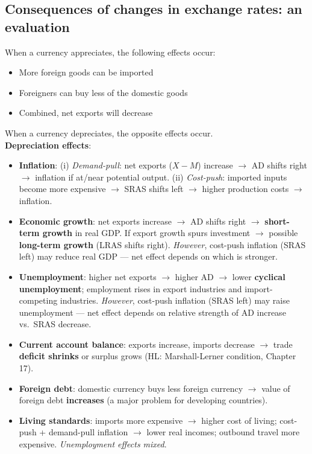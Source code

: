 \documentclass[a4paper,12pt]{article}
\begin{document}
\subsection{Consequences of changes in exchange rates: an evaluation}
When a currency appreciates, the following effects occur:
\begin{itemize}
  \item More foreign goods can be imported
  \item Foreigners can buy less of the domestic goods
  \item Combined, net exports will decrease
\end{itemize}
When a currency depreciates, the opposite effects occur.\\
\textbf{Depreciation effects}:
\begin{itemize}
  \item \textbf{Inflation}: (i) \textit{Demand-pull}: net exports ($X - M$) increase $\to$ AD shifts right $\to$ inflation if at/near potential output. (ii) \textit{Cost-push}: imported inputs become more expensive $\to$ SRAS shifts left $\to$ higher production costs $\to$ inflation.
  \item \textbf{Economic growth}: net exports increase $\to$ AD shifts right $\to$ \textbf{short-term growth} in real GDP. If export growth spurs investment $\to$ possible \textbf{long-term growth} (LRAS shifts right). \textit{However}, cost-push inflation (SRAS left) may reduce real GDP --- net effect depends on which is stronger.
  \item \textbf{Unemployment}: higher net exports $\to$ higher AD $\to$ lower \textbf{cyclical unemployment}; employment rises in export industries and import-competing industries. \textit{However}, cost-push inflation (SRAS left) may raise unemployment --- net effect depends on relative strength of AD increase vs.\ SRAS decrease.
  \item \textbf{Current account balance}: exports increase, imports decrease $\to$ trade \textbf{deficit shrinks} or surplus grows (HL: Marshall-Lerner condition, Chapter 17).
  \item \textbf{Foreign debt}: domestic currency buys less foreign currency $\to$ value of foreign debt \textbf{increases} (a major problem for developing countries).
  \item \textbf{Living standards}: imports more expensive $\to$ higher cost of living; cost-push + demand-pull inflation $\to$ lower real incomes; outbound travel more expensive. \textit{Unemployment effects mixed}.
\end{itemize}
\end{document}
